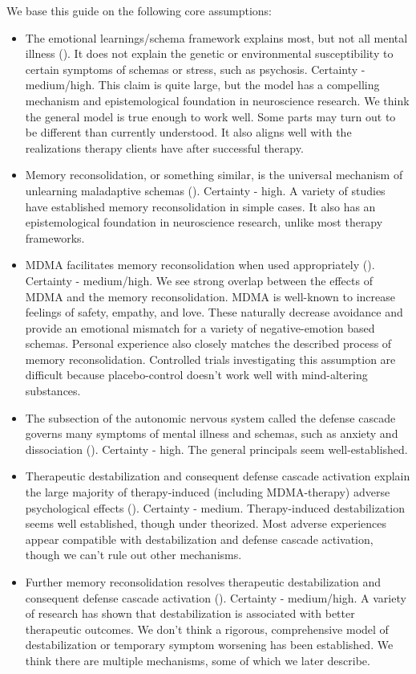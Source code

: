 \documentclass[12pt,letterpaper]{book}
\begin{document}
We base this guide on the following core assumptions:
\begin{itemize}
	\item The emotional learnings/schema framework explains most, but not all mental illness (\textcite{lesswrongCoherenceTherapy,eckerUnlocking}). It does not explain the genetic or environmental susceptibility to certain symptoms of schemas or stress, such as psychosis. Certainty - medium/high. This claim is quite large, but the model has a compelling mechanism and epistemological foundation in neuroscience research. We think the general model is true enough to work well. Some parts may turn out to be different than currently understood. It also aligns well with the realizations therapy clients have after successful therapy.
	\item Memory reconsolidation, or something similar, is the universal mechanism of unlearning maladaptive schemas (\textcite{lesswrongCoherenceTherapy,eckerUnlocking}). Certainty - high. A variety of studies have established memory reconsolidation in simple cases. It also has an epistemological foundation in neuroscience research, unlike most therapy frameworks. 
	\item MDMA facilitates memory reconsolidation when used appropriately (\textcite{fedduciaMDMAMemoryReconsolidation}). Certainty - medium/high. We see strong overlap between the effects of MDMA and the memory reconsolidation. MDMA is well-known to increase feelings of safety, empathy, and love. These naturally decrease avoidance and provide an emotional mismatch for a variety of negative-emotion based schemas. Personal experience also closely matches the described process of memory reconsolidation. Controlled trials investigating this assumption are difficult because placebo-control doesn't work well with mind-altering substances.
	\item The subsection of the autonomic nervous system called the defense cascade governs many symptoms of mental illness and schemas, such as anxiety and dissociation (\textcite{kozlowskaDefenseCascade}). Certainty - high. The general principals seem well-established.
	\item Therapeutic destabilization and consequent defense cascade activation explain the large majority of therapy-induced (including MDMA-therapy) adverse psychological effects (\textcite{olthofDestabilization}). Certainty - medium. Therapy-induced destabilization seems well established, though under theorized. Most adverse experiences appear compatible with destabilization and defense cascade activation, though we can't rule out other mechanisms.
	\item Further memory reconsolidation resolves therapeutic destabilization and consequent defense cascade activation (\textcite{olthofDestabilization}). Certainty - medium/high. A variety of research has shown that destabilization is associated with better therapeutic outcomes. We don't think a rigorous, comprehensive model of destabilization or temporary symptom worsening has been established. We think there are multiple mechanisms, some of which we later describe.
\end{itemize}
\end{document}
